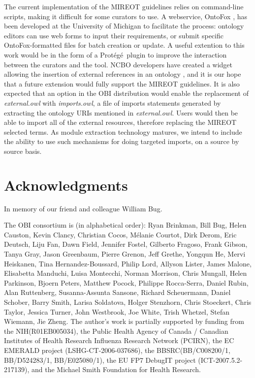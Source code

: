 \documentclass{ao2e}%
\newcommand{\protege}{Prot\'{e}g\'{e}}
\begin{document}
The current implementation of the \ac{MIREOT} guidelines relies on command-line scripts, making it difficult for some curators to use. 
A webservice, OntoFox \cite{OntoFox}, has been developed at the University of Michigan to facilitate the process: ontology editors can use web forms to input their requirements, or submit specific OntoFox-formatted files for batch creation or update.
A useful extention to this work would be in the form of a \protege\  plugin to improve the interaction between the curators and the tool. NCBO developers have created a widget allowing the insertion of external references in an ontology \cite{NCBOWidget}, and it is our hope that a future extension would fully support the MIREOT guidelines.
It is also expected that an option in the OBI distribution would enable the replacement of \emph{external.owl} with \emph{imports.owl}, a file of imports statements generated by extracting the ontology URIs mentioned in \emph{external.owl}. Users would then be able to import all of the external resources, therefore replacing the MIREOT selected terms.  As module extraction technology matures, we intend to include the ability to use such mechanisms for doing targeted imports, on a source by source basis.%



\section*{Acknowledgments}

In memory of our friend and colleague William Bug. 

The OBI consortium is (in alphabetical order): Ryan Brinkman, Bill Bug, Helen Causton, Kevin Clancy, Christian Cocos, M\'elanie Courtot, Dirk Derom, Eric Deutsch, Liju Fan, Dawn Field, Jennifer Fostel, Gilberto Fragoso, Frank Gibson, Tanya Gray, Jason Greenbaum, Pierre Grenon, Jeff Grethe, Yongqun He, Mervi Heiskanen, Tina Hernandez-Boussard, Philip Lord, Allyson Lister, James Malone, Elisabetta Manduchi, Luisa Montecchi, Norman Morrison, Chris Mungall, Helen Parkinson, Bjoern Peters, Matthew Pocock, Philippe Rocca-Serra, Daniel Rubin, Alan Ruttenberg, Susanna-Assunta Sansone, Richard Scheuermann, Daniel Schober, Barry Smith, Larisa Soldatova, Holger Stenzhorn, Chris Stoeckert, Chris Taylor, Jessica Turner, John Westbrook,  Joe White, Trish Whetzel, Stefan Wiemann, Jie Zheng. 
The author's work is partially supported by funding from the NIH(R01EB005034),  the Public Health Agency of Canada / Canadian Institutes of Health Research Influenza Research Network (PCIRN), the EC EMERALD project (LSHG-CT-2006-037686), the BBSRC(BB/C008200/1, BB/D524283/1, BB/E025080/1), the EU FP7 DebugIT project (ICT-2007.5.2-217139), and the Michael Smith Foundation for Health Research.
\end{document}
